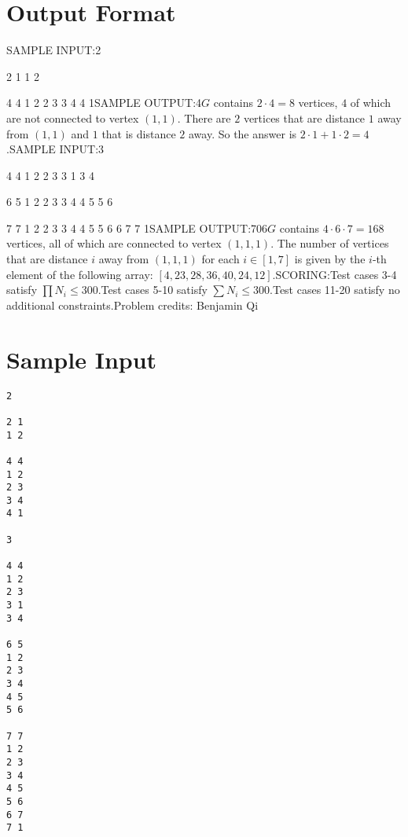 \documentclass[12pt]{article}
\begin{document}
\section*{Output Format}
SAMPLE INPUT:2

2 1
1 2

4 4
1 2
2 3
3 4
4 1SAMPLE OUTPUT:4$G$ contains $2\cdot 4=8$ vertices, $4$ of which are not connected to vertex
$(1,1)$.  There are $2$ vertices that are distance $1$ away from $(1,1)$ and $1$
that is distance $2$ away. So the answer is $2\cdot 1+1\cdot 2=4$.SAMPLE INPUT:3

4 4
1 2
2 3
3 1
3 4

6 5
1 2
2 3
3 4
4 5
5 6

7 7
1 2
2 3
3 4
4 5
5 6
6 7
7 1SAMPLE OUTPUT:706$G$ contains $4\cdot 6\cdot 7=168$ vertices, all of which are connected to
vertex $(1,1,1)$.  The number of vertices that are distance $i$ away from
$(1,1,1)$ for each $i\in [1,7]$ is given by the $i$-th element of the following
array:
$[4,23,28,36,40,24,12]$.SCORING:Test cases 3-4 satisfy $\prod N_i\le 300$.Test cases 5-10 satisfy $\sum N_i\le 300$.Test cases 11-20 satisfy no additional constraints.Problem credits: Benjamin Qi

\section*{Sample Input}
\begin{verbatim}
2

2 1
1 2

4 4
1 2
2 3
3 4
4 1

3

4 4
1 2
2 3
3 1
3 4

6 5
1 2
2 3
3 4
4 5
5 6

7 7
1 2
2 3
3 4
4 5
5 6
6 7
7 1
\end{verbatim}
\end{document}
